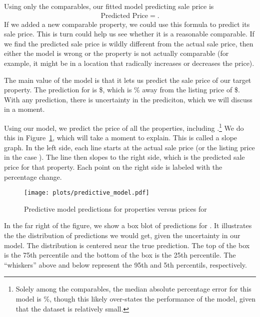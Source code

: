 \documentclass[
12pt, %
letterpaper, %
oneside, %
headinclude,footinclude, %
BCOR5mm, %
]{scrartcl}
\begin{document}
Using only the comparables, our fitted model predicting sale price is 
\begin{align*}
\mbox{Predicted Price} = .
\end{align*}
If we added a new comparable property, we could use this formula to predict its sale price.
This is turn could help us see whether it is a reasonable comparable. If we find the predicted sale price is wildly different from the actual sale price, then either the model is wrong or the property is not actually comparable (for example, it might be in a location that radically increases or decreases the price). 

The main value of the model is that it lets us predict the sale price of our target property.
The prediction for \PropertyName{} is \$\PropertyPricePredictionComplex{}, which is \PropertyPricePredictionComplexPercent{}\% away from the listing price of \$\PropertyPrice{}.  
With any prediction, there is uncertainty in the prediciton, which we will discuss in a moment. 

Using our model, we predict the price of all the properties, including \PropertyName{}.\footnote{
  Solely among the comparables, the median absolute percentage error for this model is \MAPE{}\%, though this likely over-states the performance of the model, given that the dataset is relatively small. 
}
We do this in Figure~\ref{fig:predictive_model}, which will take a moment to explain.
This is called a slope graph.
In the left side, each line starts at the actual sale price (or the listing price in the case \PropertyName{}).
The line then slopes to the right side, which is the predicted sale price for that property.
Each point on the right side is labeled with the percentage change. 

\begin{figure}
\centering
\caption{Predictive model predictions for properties versus prices for \PropertyName{}} \label{fig:predictive_model}  
\texttt{[image: plots/predictive\_model.pdf]} 
\end{figure}

In the far right of the figure, we show a box blot of predictions for \PropertyName{}.
It illustrates the the distribution of predictions we would get, given the uncertainty in our model. 
The distribution is centered near the true prediction.
The top of the box is the 75th percentile and the bottom of the box is the 25th percentile.
The ``whiskers'' above and below represent the 95th and 5th percentils, respectively. 
\end{document}
